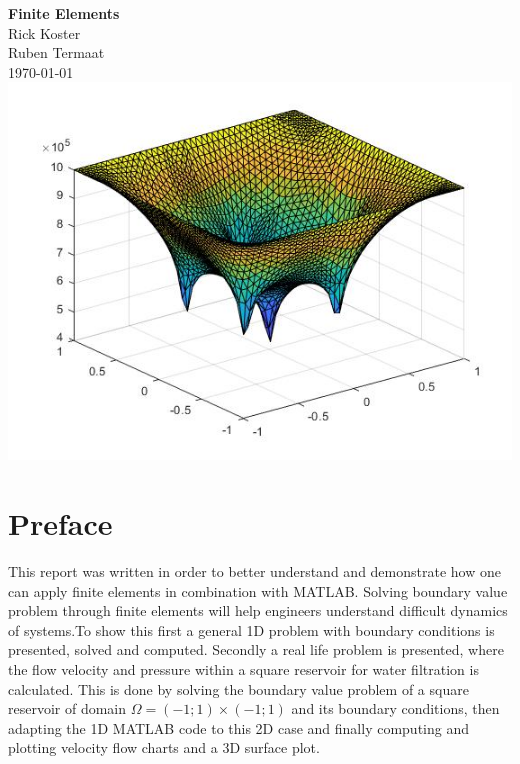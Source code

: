 \documentclass[a4paper]{report}
\begin{document}
	
\begin{titlepage}

		\centering
		\vspace*{5\baselineskip}
		\Huge
		\textbf{Finite Elements}
		\\[2\baselineskip]
		\normalsize
		Rick Koster\\
		Ruben Termaat\\
		\today
		\vfill
		\includegraphics[width=15cm]{3Dv.jpg}
		\vfill
	
\end{titlepage}
	
\clearpage\mbox{}\clearpage



\chapter*{Preface}
This report was written in order to better understand and demonstrate how one can apply finite elements in combination with MATLAB. Solving boundary value problem through finite elements will help engineers understand difficult dynamics of systems.To show this first a general 1D problem with boundary conditions is presented, solved and computed. Secondly a real life problem is presented, where the flow velocity and pressure within a square reservoir for water filtration is calculated. This is done by solving the boundary value problem of a square reservoir of domain  $\Omega= (-1; 1) \times (-1; 1)$ and its boundary conditions, then adapting the 1D MATLAB code to this 2D case and finally computing and plotting velocity flow charts and a 3D surface plot.
\end{document}
